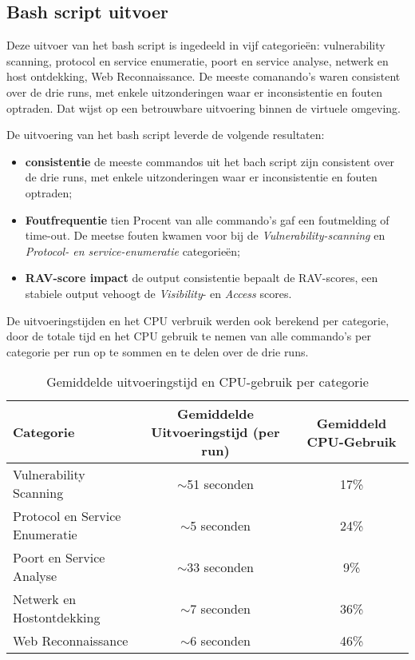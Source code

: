 \subsection{Bash script uitvoer}

Deze uitvoer van het bash script is ingedeeld in vijf categorieën: vulnerability scanning, protocol en service enumeratie, poort en service analyse, netwerk en host ontdekking, Web Reconnaissance.
De meeste comanando's waren consistent over de drie runs, met enkele uitzonderingen waar er inconsistentie en fouten optraden.
Dat wijst op een betrouwbare uitvoering binnen de virtuele omgeving.

De uitvoering van het bash script leverde de volgende resultaten:

\begin{itemize}
  \item \textbf{consistentie} de meeste commandos uit het bach script zijn consistent over de drie runs, met enkele uitzonderingen waar er inconsistentie en fouten optraden;
  \item \textbf{Foutfrequentie} tien Procent van alle commando's gaf een foutmelding of time-out. De meetse fouten kwamen voor bij de \textit{Vulnerability-scanning} en \textit{Protocol- en service-enumeratie} categorieën;
  \item \textbf{RAV-score impact} de output consistentie bepaalt de RAV-scores, een stabiele output vehoogt de \textit{Visibility}- en \textit{Access} scores.
  
\end{itemize}


De uitvoeringstijden en het CPU verbruik werden ook berekend per categorie, door de totale tijd en het CPU gebruik te nemen van alle commando's per categorie per run op te sommen en te delen over de drie runs.

% 


\begin{table}[h]
  \centering
  \footnotesize
  \begin{tabular}{lcc}
  \toprule
  \textbf{Categorie} & \textbf{Gemiddelde Uitvoeringstijd (per run)} & \textbf{Gemiddeld CPU-Gebruik} \\
  \midrule
  Vulnerability Scanning & $\sim$51 seconden & 17\% \\
  Protocol en Service Enumeratie & $\sim$5 seconden & 24\% \\
  Poort en Service Analyse & $\sim$33 seconden & 9\% \\
  Netwerk en Hostontdekking & $\sim$7 seconden & 36\% \\
  Web Reconnaissance & $\sim$6 seconden & 46\% \\
  \bottomrule
  \end{tabular}
  \caption{Gemiddelde uitvoeringstijd en CPU-gebruik per categorie}{\label{tab:cpu-uitvoeringstijd}}
\end{table}

